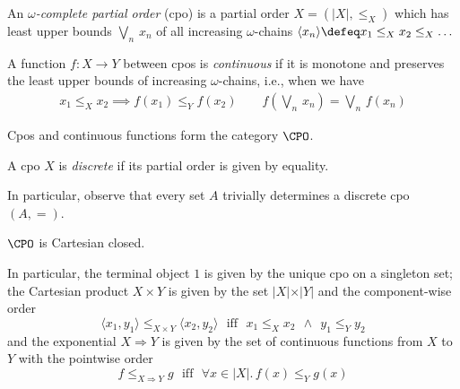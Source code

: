 \begin{definition}
An \emph{$\omega$-complete partial order} (cpo) is a partial order $X = (\vert X \vert , \leq_X)$ which has least upper bounds $\bigvee_{\!\!n} \,x_n$ of all increasing $\omega$-chains $\langle x_n \rangle \defeq x_1 \leq_X x_2 \leq_X \ldots$
\end{definition}

\begin{definition}
A function $f : X \longrightarrow Y$ between cpos is \emph{continuous} if it is monotone and preserves the least upper bounds of increasing $\omega$-chains, i.e., when we have
\[
\begin{array}{c}
x_1 \leq_X x_2 \implies f(x_1) \leq_Y f(x_2)
\qquad
f(\bigvee_{\!\!n} \,x_n) = \bigvee_{\!\!n}\, f(x_n)
\end{array}
\]
\end{definition}

\begin{proposition}
Cpos and continuous functions form the category $\CPO$.
\end{proposition}

\begin{definition}
A cpo $X$ is \emph{discrete} if its partial order is given by equality.
\end{definition}

In particular, observe that every set $A$ trivially determines a discrete cpo $(A,=)$. 

\begin{proposition}
$\CPO$ is Cartesian closed.
\end{proposition}

In particular, the terminal object $1$ is given by the unique cpo on a singleton set; the Cartesian product $X \times Y$ is given by the set $\vert X \vert \times \vert Y \vert$ and the component-wise  order
\[
\langle x_1 , y_1 \rangle \leq_{X \times Y} \langle x_2 , y_2 \rangle \text{~~iff~~} x_1 \leq_X x_2 ~~\wedge~~ y_1 \leq_Y y_2
\]
and the exponential $X \Rightarrow Y$ is given by the set of continuous functions from $X$ to $Y$ with the pointwise order
\[
f \leq_{X \Rightarrow Y} g \text{~~iff~~} \forall x \in \vert X \vert .\, f(x) \leq_Y g(x)
\]

